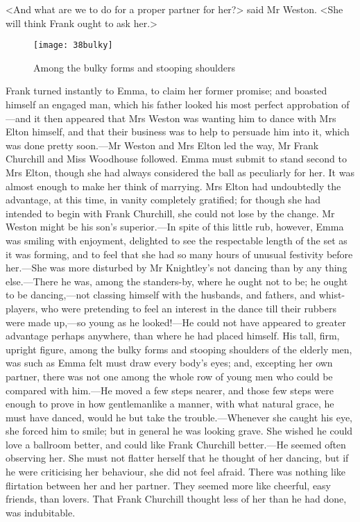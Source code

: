 <And what are we to do for a proper partner for her?> said Mr Weston. <She will think Frank ought to ask her.>

\begin{figure}[tbph]
\centering
\texttt{[image: 38bulky]}
\caption{Among the bulky forms and stooping shoulders}
\end{figure}

Frank turned instantly to Emma, to claim her former promise; and boasted himself an engaged man, which his father looked his most perfect approbation of—and it then appeared that Mrs Weston was wanting him to dance with Mrs Elton himself, and that their business was to help to persuade him into it, which was done pretty soon.—Mr Weston and Mrs Elton led the way, Mr Frank Churchill and Miss Woodhouse followed. Emma must submit to stand second to Mrs Elton, though she had always considered the ball as peculiarly for her. It was almost enough to make her think of marrying. Mrs Elton had undoubtedly the advantage, at this time, in vanity completely gratified; for though she had intended to begin with Frank Churchill, she could not lose by the change. Mr Weston might be his son's superior.—In spite of this little rub, however, Emma was smiling with enjoyment, delighted to see the respectable length of the set as it was forming, and to feel that she had so many hours of unusual festivity before her.—She was more disturbed by Mr Knightley's not dancing than by any thing else.—There he was, among the standers-by, where he ought not to be; he ought to be dancing,—not classing himself with the husbands, and fathers, and whist-players, who were pretending to feel an interest in the dance till their rubbers were made up,—so young as he looked!—He could not have appeared to greater advantage perhaps anywhere, than where he had placed himself. His tall, firm, upright figure, among the bulky forms and stooping shoulders of the elderly men, was such as Emma felt must draw every body's eyes; and, excepting her own partner, there was not one among the whole row of young men who could be compared with him.—He moved a few steps nearer, and those few steps were enough to prove in how gentlemanlike a manner, with what natural grace, he must have danced, would he but take the trouble.—Whenever she caught his eye, she forced him to smile; but in general he was looking grave. She wished he could love a ballroom better, and could like Frank Churchill better.—He seemed often observing her. She must not flatter herself that he thought of her dancing, but if he were criticising her behaviour, she did not feel afraid. There was nothing like flirtation between her and her partner. They seemed more like cheerful, easy friends, than lovers. That Frank Churchill thought less of her than he had done, was indubitable.

